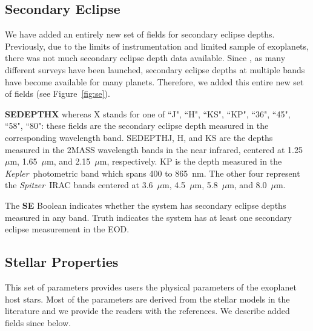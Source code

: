 \documentclass[11pt,preprint]{aastex}
\def\micron{$\mu$m}
\def\kepler{\textit{Kepler}}
\def\spitzer{\textit{Spitzer}}
\def\micron{$\mu$m}
\begin{document}
\begin{CJK*}{UTF8}{gbsn}
\subsection{Secondary Eclipse}\label{sec:se}

We have added an entirely new set of fields for secondary
eclipse depths. Previously, due to the limits of instrumentation and limited
sample of exoplanets, there was not much secondary eclipse depth data
available. Since \cite{Wright2011}, as many different surveys have
been launched, secondary eclipse depths at multiple
bands have become available for many planets. Therefore, we added
this entire new set of fields (see Figure~\ref{fig:se}).

{\bf SEDEPTHX} whereas X stands for one of ``J", ``H", ``KS", ``KP",
``36", ``45", ``58", ``80": these fields are the secondary eclipse
depth measured in the corresponding wavelength band. SEDEPTHJ, H, and
KS are the depths measured in the 2MASS wavelength bands in the near
infrared, centered at 1.25~\micron, 1.65~\micron, and 2.15~\micron,
respectively. KP is the depth measured in the \kepler\ photometric
band which spans 400 to 865~nm. The other four represent the
\spitzer\ IRAC bands centered at 3.6~\micron, 4.5~\micron,
5.8~\micron, and 8.0~\micron.

The {\bf SE} Boolean indicates whether the system has secondary
eclipse depths measured in any band.  Truth indicates the
system has at least one secondary eclipse measurement in the EOD.

\begin{comment}
{\bf SET} is the epoch of secondary eclipse center, normally given in
BJD but (as with other fields) when the literature reports HJD or UTC
JD, we do not attempt a conversion to BJD.
\end{comment}

\subsection{Stellar Properties}\label{sec:stellarprop}

This set of parameters provides users the physical parameters of
the exoplanet host stars.  Most of the parameters are derived from the
stellar models in the literature and we provide the readers with the
references. We describe added fields since \cite{Wright2011} below.


\end{CJK*}
\end{document}
